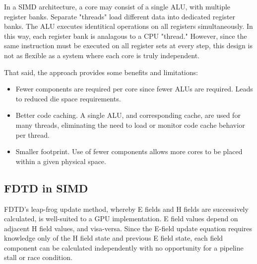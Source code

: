 In a SIMD architecture, a core may consist of a single ALU, with multiple register banks. Separate "threads" load different data into dedicated register banks. The ALU executes identitical operations on all registers simultaneously. In this way, each register bank is analagous to a CPU "thread." However, since the same instruction must be executed on all register sets at every step, this design is not as flexible as a system where each core is truly independent.

That said, the approach provides some benefits and limitations:

\begin{itemize}
	\item Fewer components are required per core since fewer ALUs are required. Leads to reduced die space requirements.
	\item Better code caching. A single ALU, and corresponding cache, are used for many threads, eliminating the need to load or monitor code cache behavior per thread.
	\item Smaller footprint. Use of fewer components allows more cores to be placed within a given physical space. 
\end{itemize}


\subsection{FDTD in SIMD}

FDTD's leap-frog update method, whereby E fields and H fields are successively calculated, is well-suited to a GPU implementation. E field values depend on adjacent H field values, and visa-versa. Since the E-field update equation requires knowledge only of the H field state and previous E field state, each field component can be calculated independently with no opportunity for a pipeline stall or race condition. 





